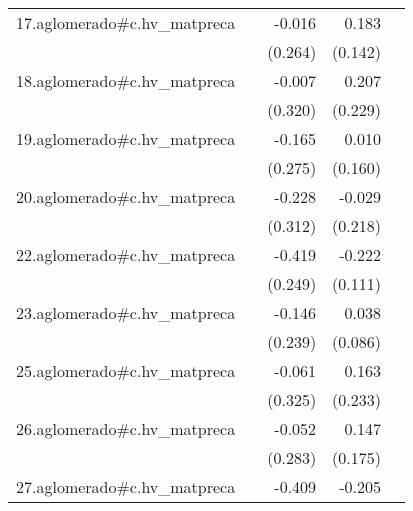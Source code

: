 {\begin{longtable}{l*{4}{D{.}{.}{-1}}}
\addlinespace
17.aglomerado#c.hv\_matpreca&                     &      -0.016         &       0.183         &                     \\
            &                     &     (0.264)         &     (0.142)         &                     \\
\addlinespace
18.aglomerado#c.hv\_matpreca&                     &      -0.007         &       0.207         &                     \\
            &                     &     (0.320)         &     (0.229)         &                     \\
\addlinespace
19.aglomerado#c.hv\_matpreca&                     &      -0.165         &       0.010         &                     \\
            &                     &     (0.275)         &     (0.160)         &                     \\
\addlinespace
20.aglomerado#c.hv\_matpreca&                     &      -0.228         &      -0.029         &                     \\
            &                     &     (0.312)         &     (0.218)         &                     \\
\addlinespace
22.aglomerado#c.hv\_matpreca&                     &      -0.419         &      -0.222\sym{*}  &                     \\
            &                     &     (0.249)         &     (0.111)         &                     \\
\addlinespace
23.aglomerado#c.hv\_matpreca&                     &      -0.146         &       0.038         &                     \\
            &                     &     (0.239)         &     (0.086)         &                     \\
\addlinespace
25.aglomerado#c.hv\_matpreca&                     &      -0.061         &       0.163         &                     \\
            &                     &     (0.325)         &     (0.233)         &                     \\
\addlinespace
26.aglomerado#c.hv\_matpreca&                     &      -0.052         &       0.147         &                     \\
            &                     &     (0.283)         &     (0.175)         &                     \\
\addlinespace
27.aglomerado#c.hv\_matpreca&                     &      -0.409         &      -0.205\sym{***}&                     \\

\end{longtable}}
